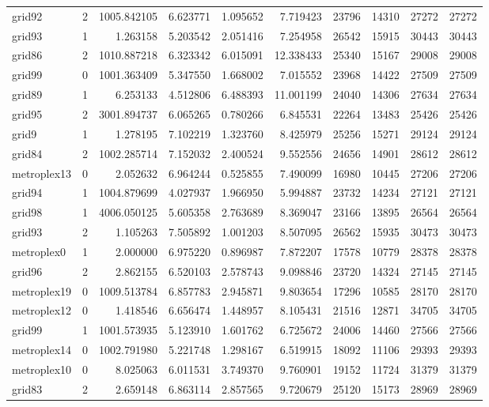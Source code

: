 \begin{longtable}{|l|r|r|r|r|r|r|r|r|r|}
grid92 & 2 & 1005.842105 & 6.623771 & 1.095652 & 7.719423 & 23796 & 14310 & 27272 & 27272 \\
grid93 & 1 & 1.263158 & 5.203542 & 2.051416 & 7.254958 & 26542 & 15915 & 30443 & 30443 \\
grid86 & 2 & 1010.887218 & 6.323342 & 6.015091 & 12.338433 & 25340 & 15167 & 29008 & 29008 \\
grid99 & 0 & 1001.363409 & 5.347550 & 1.668002 & 7.015552 & 23968 & 14422 & 27509 & 27509 \\
grid89 & 1 & 6.253133 & 4.512806 & 6.488393 & 11.001199 & 24040 & 14306 & 27634 & 27634 \\
grid95 & 2 & 3001.894737 & 6.065265 & 0.780266 & 6.845531 & 22264 & 13483 & 25426 & 25426 \\
grid9 & 1 & 1.278195 & 7.102219 & 1.323760 & 8.425979 & 25256 & 15271 & 29124 & 29124 \\
grid84 & 2 & 1002.285714 & 7.152032 & 2.400524 & 9.552556 & 24656 & 14901 & 28612 & 28612 \\
metroplex13 & 0 & 2.052632 & 6.964244 & 0.525855 & 7.490099 & 16980 & 10445 & 27206 & 27206 \\
grid94 & 1 & 1004.879699 & 4.027937 & 1.966950 & 5.994887 & 23732 & 14234 & 27121 & 27121 \\
grid98 & 1 & 4006.050125 & 5.605358 & 2.763689 & 8.369047 & 23166 & 13895 & 26564 & 26564 \\
grid93 & 2 & 1.105263 & 7.505892 & 1.001203 & 8.507095 & 26562 & 15935 & 30473 & 30473 \\
metroplex0 & 1 & 2.000000 & 6.975220 & 0.896987 & 7.872207 & 17578 & 10779 & 28378 & 28378 \\
grid96 & 2 & 2.862155 & 6.520103 & 2.578743 & 9.098846 & 23720 & 14324 & 27145 & 27145 \\
metroplex19 & 0 & 1009.513784 & 6.857783 & 2.945871 & 9.803654 & 17296 & 10585 & 28170 & 28170 \\
metroplex12 & 0 & 1.418546 & 6.656474 & 1.448957 & 8.105431 & 21516 & 12871 & 34705 & 34705 \\
grid99 & 1 & 1001.573935 & 5.123910 & 1.601762 & 6.725672 & 24006 & 14460 & 27566 & 27566 \\
metroplex14 & 0 & 1002.791980 & 5.221748 & 1.298167 & 6.519915 & 18092 & 11106 & 29393 & 29393 \\
metroplex10 & 0 & 8.025063 & 6.011531 & 3.749370 & 9.760901 & 19152 & 11724 & 31379 & 31379 \\
grid83 & 2 & 2.659148 & 6.863114 & 2.857565 & 9.720679 & 25120 & 15173 & 28969 & 28969 \\

\end{longtable}
